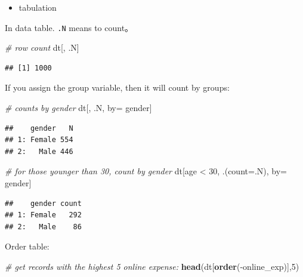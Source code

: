\documentclass[]{book}
\newenvironment{Shaded}{\begin{snugshade}}{\end{snugshade}}
\newcommand{\KeywordTok}[1]{\textcolor[rgb]{0.13,0.29,0.53}{\textbf{{#1}}}}
\newcommand{\DataTypeTok}[1]{\textcolor[rgb]{0.13,0.29,0.53}{{#1}}}
\newcommand{\DecValTok}[1]{\textcolor[rgb]{0.00,0.00,0.81}{{#1}}}
\newcommand{\StringTok}[1]{\textcolor[rgb]{0.31,0.60,0.02}{{#1}}}
\newcommand{\CommentTok}[1]{\textcolor[rgb]{0.56,0.35,0.01}{\textit{{#1}}}}
\newcommand{\NormalTok}[1]{{#1}}
\providecommand{\tightlist}{%
  \setlength{\itemsep}{0pt}\setlength{\parskip}{0pt}}
\theoremstyle{definition}
\theoremstyle{definition}
\theoremstyle{remark}
\begin{document}
\begin{itemize}
\tightlist
\item
  tabulation
\end{itemize}

In data table. \texttt{.N} means to count。

\begin{Shaded}
\begin{Highlighting}[]
\CommentTok{# row count}
\NormalTok{dt[, .N] }
\end{Highlighting}
\end{Shaded}

\begin{verbatim}
## [1] 1000
\end{verbatim}

If you assign the group variable, then it will count by groups:

\begin{Shaded}
\begin{Highlighting}[]
\CommentTok{# counts by gender}
\NormalTok{dt[, .N, by=}\StringTok{ }\NormalTok{gender]  }
\end{Highlighting}
\end{Shaded}

\begin{verbatim}
##    gender   N
## 1: Female 554
## 2:   Male 446
\end{verbatim}

\begin{Shaded}
\begin{Highlighting}[]
\CommentTok{# for those younger than 30, count by gender}
 \NormalTok{dt[age <}\StringTok{ }\DecValTok{30}\NormalTok{, .(}\DataTypeTok{count=}\NormalTok{.N), by=}\StringTok{ }\NormalTok{gender] }
\end{Highlighting}
\end{Shaded}

\begin{verbatim}
##    gender count
## 1: Female   292
## 2:   Male    86
\end{verbatim}

Order table:

\begin{Shaded}
\begin{Highlighting}[]
\CommentTok{# get records with the highest 5 online expense:}
\KeywordTok{head}\NormalTok{(dt[}\KeywordTok{order}\NormalTok{(-online_exp)],}\DecValTok{5}\NormalTok{) }
\end{Highlighting}
\end{Shaded}
\end{document}
